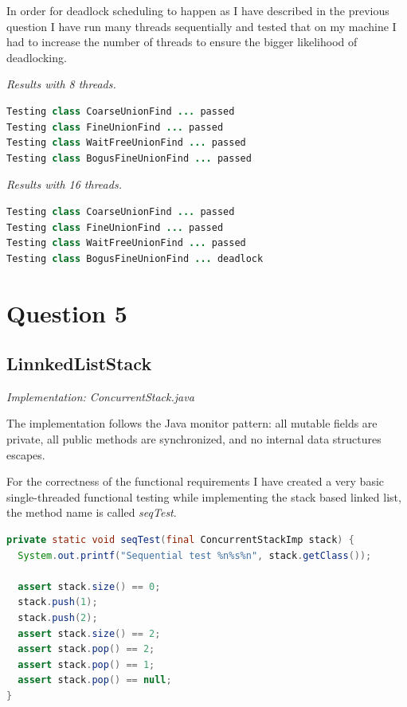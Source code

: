 \documentclass[format=acmsmall, review=false, screen=true]{acmart}
\begin{document}
In order for deadlock scheduling to happen as I have described in the previous question I have run many threads sequentially and tested that on my machine I had to increase the number of threads to ensure the bigger likelihood of deadlocking.

\textit{Results with 8 threads.}

\begin{lstlisting}[language=java]
Testing class CoarseUnionFind ... passed
Testing class FineUnionFind ... passed
Testing class WaitFreeUnionFind ... passed
Testing class BogusFineUnionFind ... passed
\end{lstlisting}

\textit{Results with 16 threads.}

\begin{lstlisting}[language=java]
Testing class CoarseUnionFind ... passed
Testing class FineUnionFind ... passed
Testing class WaitFreeUnionFind ... passed
Testing class BogusFineUnionFind ... deadlock
\end{lstlisting}

\section{Question 5}

\subsection{LinnkedListStack}

\textit{Implementation: ConcurrentStack.java}

The implementation follows the Java monitor pattern: all mutable fields are private,
all public methods are synchronized, and no internal data structures escapes.

For the correctness of the functional requirements I have created a very
basic single-threaded functional testing while implementing the stack based
linked list, the method name is called \textit{seqTest}.

\begin{lstlisting}[language=java]
private static void seqTest(final ConcurrentStackImp stack) {
  System.out.printf("Sequential test %n%s%n", stack.getClass());

  assert stack.size() == 0;
  stack.push(1);
  stack.push(2);
  assert stack.size() == 2;
  assert stack.pop() == 2;
  assert stack.pop() == 1;
  assert stack.pop() == null;
}
\end{lstlisting}
\end{document}

